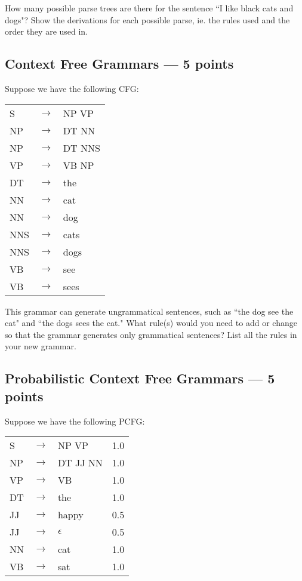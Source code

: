 \documentclass[12pt,a4paper]{article}
\begin{document}
How many possible parse trees are there for the sentence ``I like black cats and dogs"? Show the derivations for each possible parse, ie. the rules used and the order they are used in.

\subsection{Context Free Grammars --- 5 points}

Suppose we have the following CFG:

\begin{center}
\begin{tabular}{l c l}
S & $\rightarrow$ & NP VP \\
NP & $\rightarrow$ & DT NN \\
NP & $\rightarrow$ & DT NNS \\
VP & $\rightarrow$ & VB NP \\
DT & $\rightarrow$ & the \\
NN & $\rightarrow$ & cat \\
NN & $\rightarrow$ & dog \\
NNS & $\rightarrow$ & cats \\
NNS & $\rightarrow$ & dogs \\
VB & $\rightarrow$ & see \\
VB & $\rightarrow$ & sees\\
\end{tabular}
\end{center}

This grammar can generate ungrammatical sentences, such as ``the dog see the cat" and ``the dogs sees the cat." What rule(s) would you need to add or change so that the grammar generates only grammatical sentences? List all the rules in your new grammar.

\subsection{Probabilistic Context Free Grammars --- 5 points}

Suppose we have the following PCFG:

\begin{center}
\begin{tabular}{l c l l}
S & $\rightarrow$ & NP VP & 1.0 \\
NP & $\rightarrow$ & DT JJ NN & 1.0 \\
VP & $\rightarrow$ & VB & 1.0 \\
DT & $\rightarrow$ & the & 1.0 \\
JJ & $\rightarrow$ & happy & 0.5 \\
JJ & $\rightarrow$ & $\epsilon$ & 0.5 \\
NN & $\rightarrow$ & cat & 1.0 \\
VB & $\rightarrow$ & sat & 1.0 \\
\end{tabular}
\end{center}
\end{document}
